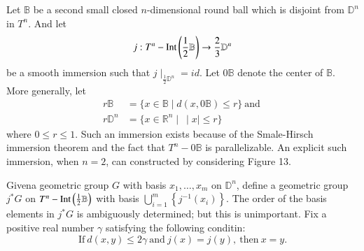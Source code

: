 Let $\mathbb{B}$ be a second small closed $n$-dimensional round ball
which is disjoint from $\mathbb{D}^n$ in $T^n$. And let 
$$
j: T^n - \operatorname{Int} \left(\frac{1}{2}\mathbb{B} \right) \to \frac{2}{3} \mathbb{D}^n
$$
be a smooth immersion such that $j\mid_{\frac{1}{2}
  \mathbb{D}^n}=id$. Let $0\mathbb{B}$ denote the center of
$\mathbb{B}$. More generally, let
\begin{align*}
  r \mathbb{B} & = \{ x \in \mathbb{B}\mid d (x, 0 \mathbb{B}) \leq
  r\} ~\text{and}~\\
  r \mathbb{D}^n & = \{ x \in \mathbb{R}^n \mid ~ \mid x\mid \leq r \}
\end{align*}
where $0 \leq r \leq 1$. Such an immersion exists because of the
Smale-Hirsch immersion theorem and the fact that $T^n-0\mathbb{B}$ is
parallelizable. An explicit such immersion, when $n=2$, can
constructed by considering Figure 13.
\begin{figure}[H]
\end{figure}

Given\pageoriginale a geometric group $G$ with basis $x_1, \ldots , x_m$ on
$\mathbb{D}^n$, define a geometric group $j^* G$ on $T^n - \operatorname{Int} \left(
\frac{1}{2} \mathbb{B}\right)$ with basis
$\displaystyle{\bigcup_{i=1}^m \left\{j^{-1} (x_i) \right\}}$. The
order of the basis elements in $j^* G$ is ambiguously determined; but
this is unimportant. Fix a positive real number $\gamma$ satisfying
the following conditin:
\begin{equation*}
  \text{If} ~ d(x, y)\leq 2 \gamma ~\text{and}~ j(x) = j(y),
  ~\text{then}~x=y. \tag{0}
\end{equation*}

